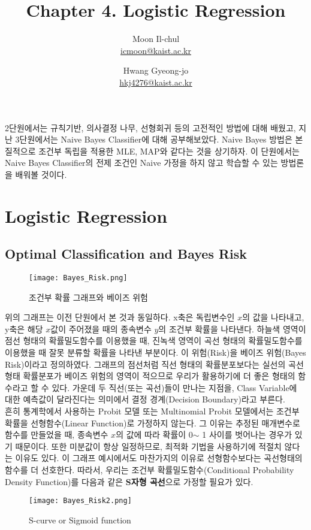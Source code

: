 \documentclass[a4paper]{oblivoir}
\author{Moon Il-chul \\ \href{mailto:icmoon@kaist.ac.kr}{icmoon@kaist.ac.kr} 
   \and Hwang Gyeong-jo
 \\ \href{mailto:hkj4276@kaist.ac.kr}{hkj4276@kaist.ac.kr} }
\title{Chapter 4. Logistic Regression}
\begin{document}
\maketitle
\tableofcontents

\section*{}
2단원에서는 규칙기반, 의사결정 나무, 선형회귀 등의 고전적인 방법에 대해 배웠고, 지난 3단원에서는 Naive Bayes Classifier에 대해 공부해보았다. Naive Bayes 방법은 본질적으로 조건부 독립을 적용한 MLE, MAP와 같다는 것을 상기하자. 이 단원에서는 Naive Bayes Classifier의 전제 조건인 Naive 가정을 하지 않고 학습할 수 있는 방법론을 배워볼 것이다.

\section{Logistic Regression}

\subsection{Optimal Classification and Bayes Risk}
\begin{figure}[ht]
\centering
\texttt{[image: Bayes\_Risk.png]}
\caption{조건부 확률 그래프와 베이즈 위험}
\label{Figure 4-1}
\end{figure}

\indent 위의 그래프는 이전 단원에서 본 것과 동일하다. x축은 독립변수인 $x$의 값을 나타내고, y축은 해당 $x$값이 주어졌을 때의 종속변수 $y$의 조건부 확률을 나타낸다. 하늘색 영역이 점선 형태의 확률밀도함수를 이용했을 때, 진녹색 영역이 곡선 형태의 확률밀도함수를 이용했을 때 잘못 분류할 확률을 나타낸 부분이다. 이 위험(Risk)을 베이즈 위험(Bayes Risk)이라고 정의하였다. 그래프의 점선처럼 직선 형태의 확률분포보다는 실선의 곡선 형태 확률분포가 베이즈 위험의 영역이 적으므로 우리가 활용하기에 더 좋은 형태의 함수라고 할 수 있다. 가운데 두 직선(또는 곡선)들이 만나는 지점을, Class Variable에 대한 예측값이 달라진다는 의미에서 결정 경계(Decision Boundary)라고 부른다. \\
\indent 흔히 통계학에서 사용하는 Probit 모델 또는 Multinomial Probit 모델에서는 조건부 확률을 선형함수(Linear Function)로 가정하지 않는다. 그 이유는 추정된 매개변수로 함수를 만들었을 때, 종속변수 $x$의 값에 따라 확률이 0$\sim$ 1 사이를 벗어나는 경우가 있기 때문이다. 또한 미분값이 항상 일정하므로, 최적화 기법을 사용하기에 적절치 않다는 이유도 있다. 이 그래프 예시에서도 마찬가지의 이유로 선형함수보다는 곡선형태의 함수를 더 선호한다. 따라서, 우리는 조건부 확률밀도함수(Conditional Probability Density Function)를 다음과 같은 \textbf{S자형 곡선}으로 가정할 필요가 있다. \\
\begin{figure}[ht]
\centering
\texttt{[image: Bayes\_Risk2.png]}
\caption{S-curve or Sigmoid function}
\label{Figure 4-2}
\end{figure}
\end{document}
